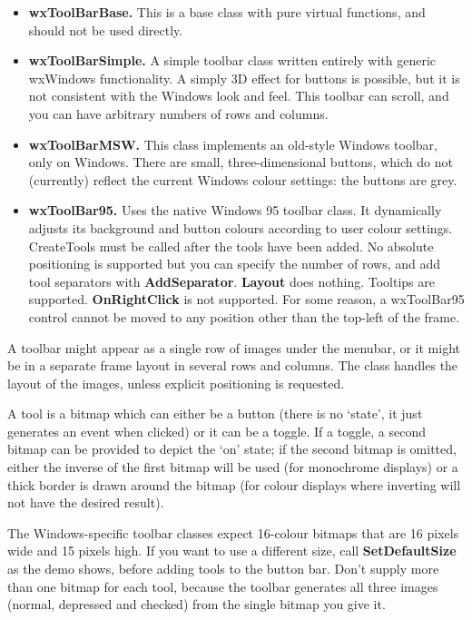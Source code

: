 \begin{itemize}\itemsep=0pt
\item {\bf wxToolBarBase.} This is a base class with pure virtual functions,
and should not be used directly.
\item {\bf wxToolBarSimple.} A simple toolbar class written entirely with generic wxWindows
functionality. A simply 3D effect for buttons is possible, but it is not consistent
with the Windows look and feel. This toolbar can scroll, and you can have arbitrary
numbers of rows and columns.
\item {\bf wxToolBarMSW.} This class implements an old-style Windows toolbar, only on
Windows. There are small, three-dimensional buttons, which do not (currently) reflect
the current Windows colour settings: the buttons are grey.
\item {\bf wxToolBar95.} Uses the native Windows 95 toolbar class. It dynamically adjusts its
background and button colours according to user colour settings.
CreateTools must be called after the tools have been added.
No absolute positioning is supported but you can specify the number
of rows, and add tool separators with {\bf AddSeparator}. {\bf Layout} does nothing.
Tooltips are supported. {\bf OnRightClick} is not supported.
For some reason, a wxToolBar95 control cannot be moved to any
position other than the top-left of the frame.
\end{itemize}

A toolbar might appear as a single row of images under
the menubar, or it might be in a separate frame layout in several rows
and columns. The class handles the layout of the images, unless explicit
positioning is requested.

A tool is a bitmap which can either be a button (there is no `state',
it just generates an event when clicked) or it can be a toggle. If a
toggle, a second bitmap can be provided to depict the `on' state; if
the second bitmap is omitted, either the inverse of the first bitmap
will be used (for monochrome displays) or a thick border is drawn
around the bitmap (for colour displays where inverting will not have
the desired result).

The Windows-specific toolbar classes expect 16-colour bitmaps that are 16 pixels wide and 15 pixels
high. If you want to use a different size, call {\bf SetDefaultSize}\rtfsp
as the demo shows, before adding tools to the button bar. Don't supply more than
one bitmap for each tool, because the toolbar generates all three images (normal,
depressed and checked) from the single bitmap you give it.

